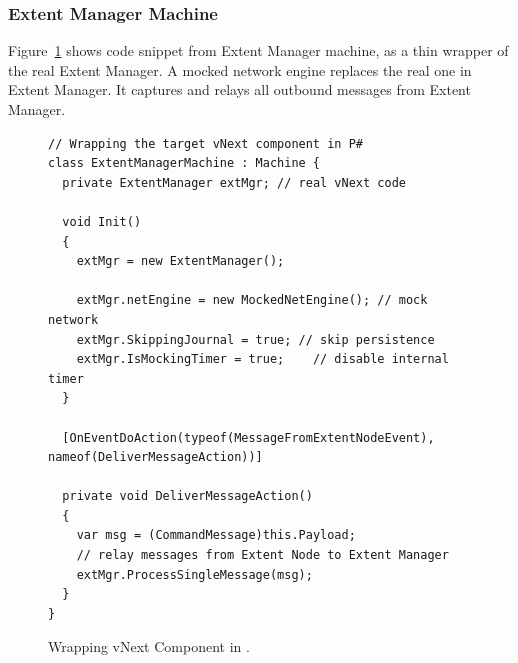 \subsubsection{Extent Manager Machine}

Figure~\ref{fig:wrap_target} shows code snippet from Extent Manager machine, as a thin wrapper of the real Extent Manager. A mocked network engine replaces the real one in Extent Manager. It captures and relays all outbound messages from Extent Manager.



\begin{figure}[t]
\begin{lstlisting}
// Wrapping the target vNext component in P#
class ExtentManagerMachine : Machine {
  private ExtentManager extMgr; // real vNext code

  void Init()
  {
    extMgr = new ExtentManager();

    extMgr.netEngine = new MockedNetEngine(); // mock network
    extMgr.SkippingJournal = true; // skip persistence
    extMgr.IsMockingTimer = true;	 // disable internal timer
  }

  [OnEventDoAction(typeof(MessageFromExtentNodeEvent), nameof(DeliverMessageAction))]
	
  private void DeliverMessageAction()
  {
    var msg = (CommandMessage)this.Payload;
    // relay messages from Extent Node to Extent Manager
    extMgr.ProcessSingleMessage(msg);
  }
}
\end{lstlisting}
\vspace{-2mm}
\caption{Wrapping vNext Component in \psharp.}
\label{fig:wrap_target}
\end{figure}

